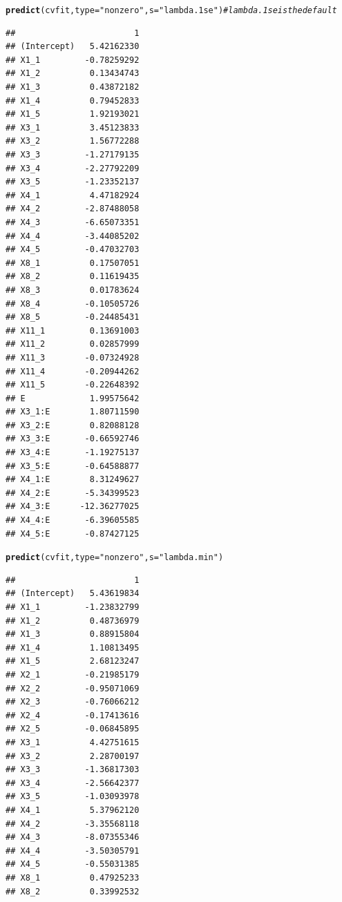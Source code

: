 \documentclass[12pt,letter]{article}\usepackage[]{graphicx}\usepackage[]{color}
\makeatletter
\newcommand{\hlstr}[1]{\textcolor[rgb]{0.192,0.494,0.8}{#1}}%
\newcommand{\hlcom}[1]{\textcolor[rgb]{0.678,0.584,0.686}{\textit{#1}}}%
\newcommand{\hlstd}[1]{\textcolor[rgb]{0.345,0.345,0.345}{#1}}%
\newcommand{\hlkwc}[1]{\textcolor[rgb]{0.333,0.667,0.333}{#1}}%
\newcommand{\hlkwd}[1]{\textcolor[rgb]{0.737,0.353,0.396}{\textbf{#1}}}%
\newenvironment{kframe}{%
 \def\at@end@of@kframe{}%
 \ifinner\ifhmode%
  \def\at@end@of@kframe{\end{minipage}}%
  \begin{minipage}{\columnwidth}%
 \fi\fi%
 \def\FrameCommand##1{\hskip\@totalleftmargin \hskip-\fboxsep
 \colorbox{shadecolor}{##1}\hskip-\fboxsep
     \hskip-\linewidth \hskip-\@totalleftmargin \hskip\columnwidth}%
 \MakeFramed {\advance\hsize-\width
   \@totalleftmargin\z@ \linewidth\hsize
   \@setminipage}}%
 {\par\unskip\endMakeFramed%
 \at@end@of@kframe}
\newenvironment{knitrout}{}{} %
\makeatother
\begin{document}
\begin{knitrout}\scriptsize
{}\color{fgcolor}\begin{kframe}
\begin{alltt}
\hlkwd{predict}\hlstd{(cvfit,} \hlkwc{type} \hlstd{=} \hlstr{"nonzero"}\hlstd{,} \hlkwc{s}\hlstd{=}\hlstr{"lambda.1se"}\hlstd{)} \hlcom{# lambda.1se is the default}
\end{alltt}
\begin{verbatim}
##                        1
## (Intercept)   5.42162330
## X1_1         -0.78259292
## X1_2          0.13434743
## X1_3          0.43872182
## X1_4          0.79452833
## X1_5          1.92193021
## X3_1          3.45123833
## X3_2          1.56772288
## X3_3         -1.27179135
## X3_4         -2.27792209
## X3_5         -1.23352137
## X4_1          4.47182924
## X4_2         -2.87488058
## X4_3         -6.65073351
## X4_4         -3.44085202
## X4_5         -0.47032703
## X8_1          0.17507051
## X8_2          0.11619435
## X8_3          0.01783624
## X8_4         -0.10505726
## X8_5         -0.24485431
## X11_1         0.13691003
## X11_2         0.02857999
## X11_3        -0.07324928
## X11_4        -0.20944262
## X11_5        -0.22648392
## E             1.99575642
## X3_1:E        1.80711590
## X3_2:E        0.82088128
## X3_3:E       -0.66592746
## X3_4:E       -1.19275137
## X3_5:E       -0.64588877
## X4_1:E        8.31249627
## X4_2:E       -5.34399523
## X4_3:E      -12.36277025
## X4_4:E       -6.39605585
## X4_5:E       -0.87427125
\end{verbatim}
\begin{alltt}
\hlkwd{predict}\hlstd{(cvfit,} \hlkwc{type} \hlstd{=} \hlstr{"nonzero"}\hlstd{,} \hlkwc{s} \hlstd{=} \hlstr{"lambda.min"}\hlstd{)}
\end{alltt}
\begin{verbatim}
##                        1
## (Intercept)   5.43619834
## X1_1         -1.23832799
## X1_2          0.48736979
## X1_3          0.88915804
## X1_4          1.10813495
## X1_5          2.68123247
## X2_1         -0.21985179
## X2_2         -0.95071069
## X2_3         -0.76066212
## X2_4         -0.17413616
## X2_5         -0.06845895
## X3_1          4.42751615
## X3_2          2.28700197
## X3_3         -1.36817303
## X3_4         -2.56642377
## X3_5         -1.03093978
## X4_1          5.37962120
## X4_2         -3.35568118
## X4_3         -8.07355346
## X4_4         -3.50305791
## X4_5         -0.55031385
## X8_1          0.47925233
## X8_2          0.33992532

\end{verbatim}
\end{kframe}
\end{knitrout}
\end{document}
